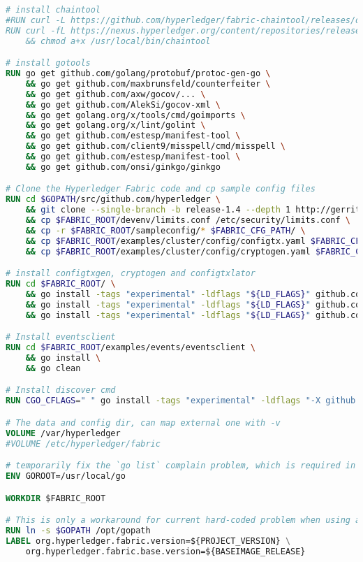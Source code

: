 \begin{lstlisting}[caption={Hyperledger Fabric Peer \textit{Dockerfile}},captionpos=b,language=Dockerfile,label=lst:dockerfile-hl-peer]
# install chaintool
#RUN curl -L https://github.com/hyperledger/fabric-chaintool/releases/download/v0.10.3/chaintool > /usr/local/bin/chaintool \
RUN curl -fL https://nexus.hyperledger.org/content/repositories/releases/org/hyperledger/fabric/hyperledger-fabric/chaintool-${CHAINTOOL_RELEASE}/hyperledger-fabric-chaintool-${CHAINTOOL_RELEASE}.jar > /usr/local/bin/chaintool \
    && chmod a+x /usr/local/bin/chaintool

# install gotools
RUN go get github.com/golang/protobuf/protoc-gen-go \
    && go get github.com/maxbrunsfeld/counterfeiter \
    && go get github.com/axw/gocov/... \
    && go get github.com/AlekSi/gocov-xml \
    && go get golang.org/x/tools/cmd/goimports \
    && go get golang.org/x/lint/golint \
    && go get github.com/estesp/manifest-tool \
    && go get github.com/client9/misspell/cmd/misspell \
    && go get github.com/estesp/manifest-tool \
    && go get github.com/onsi/ginkgo/ginkgo

# Clone the Hyperledger Fabric code and cp sample config files
RUN cd $GOPATH/src/github.com/hyperledger \
    && git clone --single-branch -b release-1.4 --depth 1 http://gerrit.hyperledger.org/r/fabric \
    && cp $FABRIC_ROOT/devenv/limits.conf /etc/security/limits.conf \
    && cp -r $FABRIC_ROOT/sampleconfig/* $FABRIC_CFG_PATH/ \
    && cp $FABRIC_ROOT/examples/cluster/config/configtx.yaml $FABRIC_CFG_PATH/ \
    && cp $FABRIC_ROOT/examples/cluster/config/cryptogen.yaml $FABRIC_CFG_PATH/

# install configtxgen, cryptogen and configtxlator
RUN cd $FABRIC_ROOT/ \
    && go install -tags "experimental" -ldflags "${LD_FLAGS}" github.com/hyperledger/fabric/common/tools/configtxgen \
    && go install -tags "experimental" -ldflags "${LD_FLAGS}" github.com/hyperledger/fabric/common/tools/cryptogen \
    && go install -tags "experimental" -ldflags "${LD_FLAGS}" github.com/hyperledger/fabric/common/tools/configtxlator

# Install eventsclient
RUN cd $FABRIC_ROOT/examples/events/eventsclient \
    && go install \
    && go clean

# Install discover cmd
RUN CGO_CFLAGS=" " go install -tags "experimental" -ldflags "-X github.com/hyperledger/fabric/cmd/discover/metadata.Version=${BASE_VERSION}" github.com/hyperledger/fabric/cmd/discover

# The data and config dir, can map external one with -v
VOLUME /var/hyperledger
#VOLUME /etc/hyperledger/fabric

# temporarily fix the `go list` complain problem, which is required in chaincode packaging, see core/chaincode/platforms/golang/platform.go#GetDepoymentPayload
ENV GOROOT=/usr/local/go

WORKDIR $FABRIC_ROOT

# This is only a workaround for current hard-coded problem when using as fabric-baseimage.
RUN ln -s $GOPATH /opt/gopath
LABEL org.hyperledger.fabric.version=${PROJECT_VERSION} \
    org.hyperledger.fabric.base.version=${BASEIMAGE_RELEASE}
\end{lstlisting}

